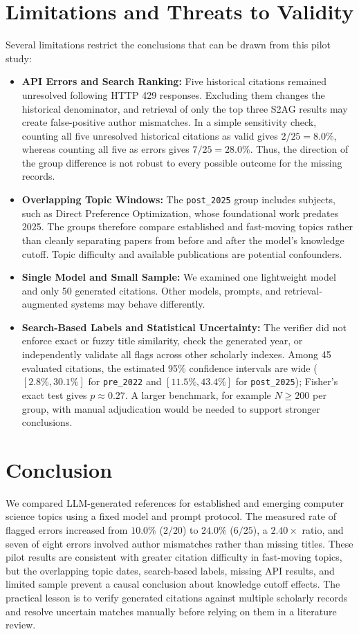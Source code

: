 \documentclass[manuscript,screen]{acmart}
\begin{document}
\section{Limitations and Threats to Validity}
Several limitations restrict the conclusions that can be drawn from this pilot study:
\begin{itemize}
    \item \textbf{API Errors and Search Ranking:} Five historical citations remained unresolved following HTTP 429 responses. Excluding them changes the historical denominator, and retrieval of only the top three S2AG results may create false-positive author mismatches. In a simple sensitivity check, counting all five unresolved historical citations as valid gives $2/25=8.0\%$, whereas counting all five as errors gives $7/25=28.0\%$. Thus, the direction of the group difference is not robust to every possible outcome for the missing records.
    \item \textbf{Overlapping Topic Windows:} The \texttt{post\_2025} group includes subjects, such as Direct Preference Optimization, whose foundational work predates 2025. The groups therefore compare established and fast-moving topics rather than cleanly separating papers from before and after the model's knowledge cutoff. Topic difficulty and available publications are potential confounders.
    \item \textbf{Single Model and Small Sample:} We examined one lightweight model and only 50 generated citations. Other models, prompts, and retrieval-augmented systems may behave differently.
    \item \textbf{Search-Based Labels and Statistical Uncertainty:} The verifier did not enforce exact or fuzzy title similarity, check the generated year, or independently validate all flags across other scholarly indexes. Among 45 evaluated citations, the estimated 95\% confidence intervals are wide ($[2.8\%, 30.1\%]$ for \texttt{pre\_2022} and $[11.5\%, 43.4\%]$ for \texttt{post\_2025}); Fisher's exact test gives $p \approx 0.27$. A larger benchmark, for example $N \ge 200$ per group, with manual adjudication would be needed to support stronger conclusions.
\end{itemize}

\section{Conclusion}
We compared LLM-generated references for established and emerging computer science topics using a fixed model and prompt protocol. The measured rate of flagged errors increased from $10.0\%$ ($2/20$) to $24.0\%$ ($6/25$), a $2.40\times$ ratio, and seven of eight errors involved author mismatches rather than missing titles. These pilot results are consistent with greater citation difficulty in fast-moving topics, but the overlapping topic dates, search-based labels, missing API results, and limited sample prevent a causal conclusion about knowledge cutoff effects. The practical lesson is to verify generated citations against multiple scholarly records and resolve uncertain matches manually before relying on them in a literature review.



\end{document}
